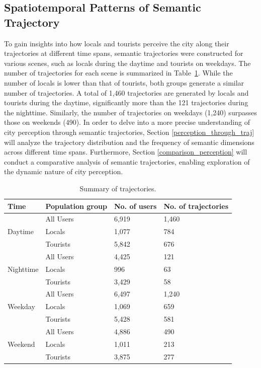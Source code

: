 \documentclass{article}
\theoremstyle{definition}
\theoremstyle{remark}
\begin{document}
\subsection{Spatiotemporal Patterns of Semantic Trajectory} \label{patterns_traj}
To gain insights into how locals and tourists perceive the city along their trajectories at different time spans, semantic trajectories were constructed for various scenes, such as locals during the daytime and tourists on weekdays. The number of trajectories for each scene is summarized in Table~\ref{tab:trajectories_summary}. While the number of locals is lower than that of tourists, both groups generate a similar number of trajectories. A total of 1,460 trajectories are generated by locals and tourists during the daytime, significantly more than the 121 trajectories during the nighttime. Similarly, the number of trajectories on weekdays (1,240) surpasses those on weekends (490). In order to delve into a more precise understanding of city perception through semantic trajectories, Section \ref{perception_through_traj} will analyze the trajectory distribution and the frequency of semantic dimensions across different time spans. Furthermore, Section \ref{comparison_perception} will conduct a comparative analysis of semantic trajectories, enabling exploration of the dynamic nature of city perception.

\begin{table}[h!]
\centering
\caption{\label{tab:trajectories_summary}Summary of trajectories.}
\begin{tabular}{llll} \hline
Time & Population group & No. of users & No. of trajectories \\
\hline
\multirow{3}{*}{Daytime} 
& All Users & 6,919 & 1,460 \\
& Locals & 1,077 & 784 \\
& Tourists & 5,842 & 676 \\
\hline
\multirow{3}{*}{Nighttime} 
& All Users & 4,425 & 121 \\
& Locals & 996 & 63 \\
& Tourists & 3,429 & 58 \\
\hline
\multirow{3}{*}{Weekday} 
& All Users & 6,497 & 1,240 \\
& Locals & 1,069 & 659 \\
& Tourists & 5,428 & 581 \\
\hline
\multirow{3}{*}{Weekend} 
& All Users & 4,886 & 490 \\
& Locals & 1,011 & 213 \\
& Tourists & 3,875 & 277 \\
\hline
\end{tabular}
\end{table}
\end{document}
